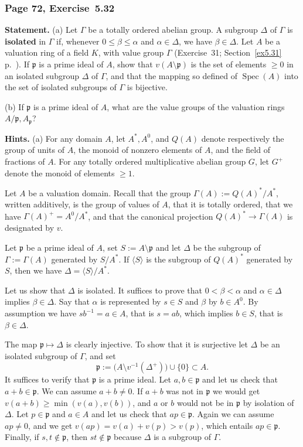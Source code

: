 \documentclass[12pt,letterpaper]{article}%
\newcommand{\mf}{\mathfrak}
\newcommand{\ppp}{\mf p}
\newcommand{\Spec}{\operatorname{Spec}}\newcommand{\Sp}{\operatorname{Spec}}
\newcommand{\nn}{\noindent}
\begin{document}
\subsubsection{Page 72, Exercise~5.32}%

\textbf{Statement.} (a) Let $\Gamma$ be a totally ordered abelian group. A subgroup $\Delta$ of $\Gamma$ is \textbf{isolated} in $\Gamma$ if, whenever $0\le\beta\le\alpha$ and $\alpha\in\Delta$, we have $\beta\in\Delta$. Let $A$ be a valuation ring of a field $K$, with value group $\Gamma$ (Exercise~31; Section~\ref{ex5.31} p.~\pageref{ex5.31}). If $\ppp$ is a prime ideal of $A$, show that $v(A\setminus\ppp)$ is the set of elements $\ge0$ in an isolated subgroup $\Delta$ of $\Gamma$, and that the mapping so defined of $\Spec(A)$ into the set of isolated subgroups of $\Gamma$ is bijective.

\nn(b) If $\ppp$ is a prime ideal of $A$, what are the value groups of the valuation rings $A/\ppp,A_\ppp$?

\nn\textbf{Hints.} (a) For any domain $A$, let $A^*,A^0$, and $Q(A)$ denote respectively the group of units of $A$, the monoid of nonzero elements of $A$, and the field of fractions of $A$. For any totally ordered multiplicative abelian group $G$, let $G^+$ denote the monoid of elements $\ge1$. 

Let $A$ be a valuation domain. Recall that the group $\Gamma(A):=Q(A)^*/A^*$, written additively, is the group of values of $A$, that it is totally ordered, that we have $\Gamma(A)^+=A^0/A^*$, and that the canonical projection $Q(A)^*\to\Gamma(A)$ is designated by $v$.

Let $\ppp$ be a prime ideal of $A$, set $S:=A\setminus\ppp$ and let $\Delta$ be the subgroup of $\Gamma:=\Gamma(A)$ generated by $S/A^*$. If $\langle S\rangle$ is the subgroup of $Q(A)^*$ generated by $S$, then we have $\Delta=\langle S\rangle/A^*$.

Let us show that $\Delta$ is isolated. It suffices to prove that $0<\beta<\alpha$ and $\alpha\in\Delta$ implies $\beta\in\Delta$. Say that $\alpha$ is represented by $s\in S$ and $\beta$ by $b\in A^0$. By assumption we have $sb^{-1}=a\in A$, that is $s=ab$, which implies $b\in S$, that is $\beta\in\Delta$.

The map $\ppp\mapsto\Delta$ is clearly injective. To show that it is surjective let $\Delta$ be an isolated subgroup of $\Gamma$, and set 
$$
\ppp:=\Big(A\setminus v^{-1}(\Delta^+)\Big)\cup\{0\}\subset A.
$$ 
It suffices to verify that $\ppp$ is a prime ideal. Let $a,b\in\ppp$ and let us check that $a+b\in\ppp$. We can assume $a+b\ne0$. If $a+b$ was not in $\ppp$ we would get $v(a+b)\ge\min(v(a),v(b))$, and $a$ or $b$ would not be in $\ppp$ by isolation of $\Delta$. Let $p\in\ppp$ and $a\in A$ and let us check that $ap\in\ppp$. Again we can assume $ap\ne0$, and we get $v(ap)=v(a)+v(p)>v(p)$, which entails $ap\in\ppp$. Finally, if $s,t\notin\ppp$, then $st\notin\ppp$ because $\Delta$ is a subgroup of $\Gamma$.
\end{document}

